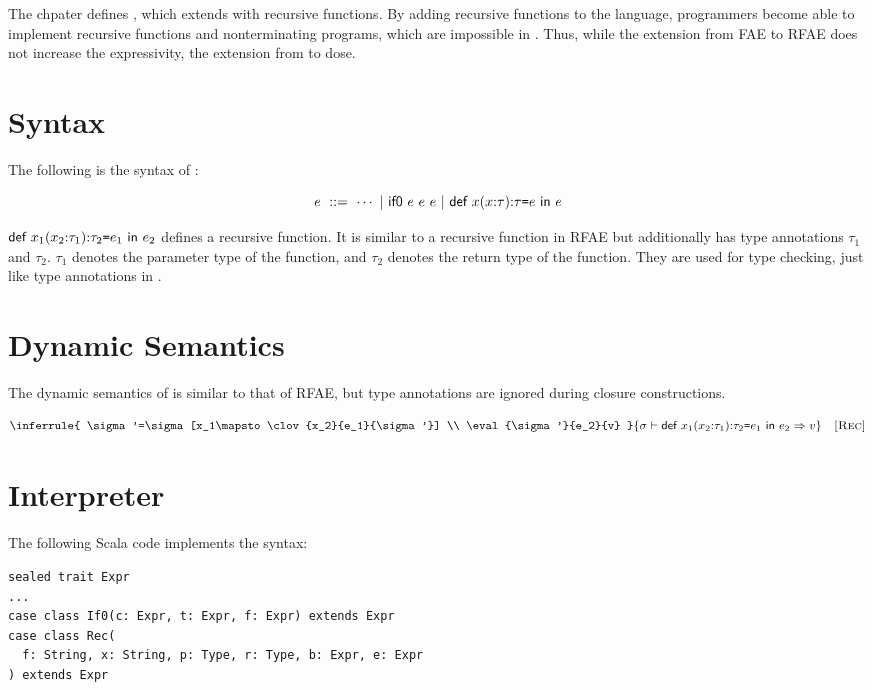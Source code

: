 The chpater defines \lang, which extends \plang with recursive functions. By
adding recursive functions to the language, programmers become able to implement
recursive functions and nonterminating programs, which are impossible in \plang.
Thus, while the extension from \textsf{FAE} to \textsf{RFAE} does not increase
the expressivity, the extension from \plang to \lang dose.

\section{Syntax}

The following is the syntax of \lang:

\[
e\ ::=\ \cdots
\ | \ \textsf{if0}\ e\ e\ e
\ | \ \textsf{def}\ x(x{:}\tau){:}\tau\texttt{=} e\ \textsf{in}\ e
\]

$\textsf{def}\ x_1(x_2{:}\tau_1){:}\tau_2\texttt{=} e_1\ \textsf{in}\ e_2$ defines a recursive
function. It is similar to a recursive function in \textsf{RFAE} but
additionally has
type annotations $\tau_1$ and $\tau_2$. $\tau_1$ denotes the parameter type of the
function, and $\tau_2$ denotes the return type of the function. They are
used for type checking, just like type annotations in \plang.

\section{Dynamic Semantics}

The dynamic semantics of \lang is similar to that of \textsf{RFAE}, but type
annotations are ignored during closure constructions.


\vspace{-1em}

\[
  \inferrule
  {
    \sigma'=\sigma[x_1\mapsto\clov{x_2}{e_1}{\sigma'}] \\
    \eval{\sigma'}{e_2}{v}
  }
  { \evald{\erect{x_1}{x_2}{\tau_1}{\tau_2}{e_1}{e_2}}{v} }
  \quad\textsc{[Rec]}
\]

\section{Interpreter}

The following Scala code implements the syntax:

\begin{verbatim}
sealed trait Expr
...
case class If0(c: Expr, t: Expr, f: Expr) extends Expr
case class Rec(
  f: String, x: String, p: Type, r: Type, b: Expr, e: Expr
) extends Expr
\end{verbatim}

